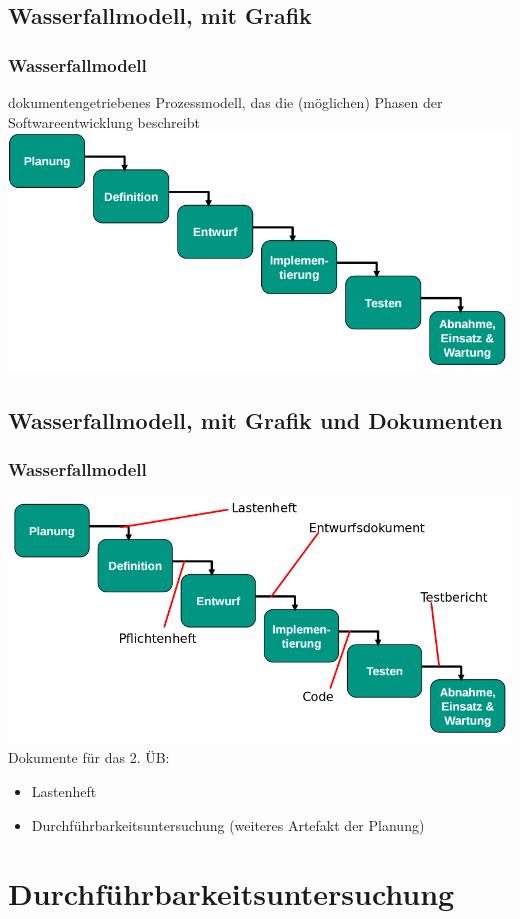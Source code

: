 \documentclass[18pt]{beamer}
\begin{document}
	\subsection{Wasserfallmodell, mit Grafik}
	\begin{frame}
		\frametitle{Wasserfallmodell}
		dokumentengetriebenes Prozessmodell, das die (möglichen) Phasen der Softwareentwicklung beschreibt
		\includegraphics[scale=0.4]{./pics/tut1/waterfall_without-docs.png}
	\end{frame}
	
	\subsection{Wasserfallmodell, mit Grafik und Dokumenten}
	\begin{frame}
		\frametitle{Wasserfallmodell}
		\includegraphics[scale=0.4]{./pics/tut1/waterfall_with-docs.png}
		Dokumente für das 2. ÜB: 
		\begin{itemize}
			\item Lastenheft
			\item Durchführbarkeitsuntersuchung (weiteres Artefakt der Planung)
		\end{itemize}
	\end{frame}

\section{Durchführbarkeitsuntersuchung}
\end{document}
